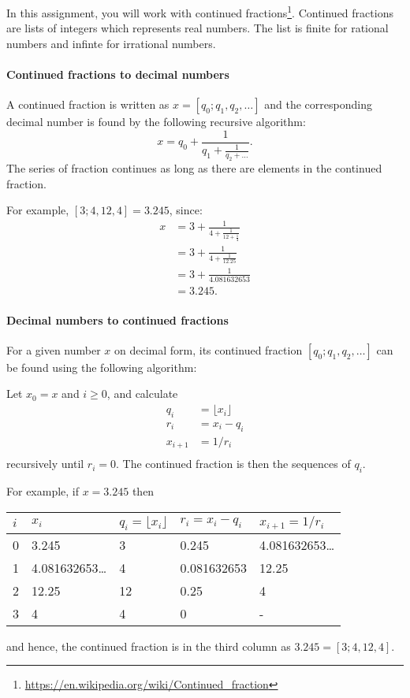In this assignment, you will work with continued
fractions\footnote{\url{https://en.wikipedia.org/wiki/Continued_fraction}}. Continued
fractions are lists of integers which represents real numbers. The
list is finite for rational numbers and infinte for irrational numbers. 

\paragraph{Continued fractions to decimal numbers}
A continued fraction is written as $x = [q_0; q_1, q_2, \ldots]$
and the corresponding decimal number is found by the following
recursive algorithm:
\begin{equation}
  x = q_0 + \frac{1}{q_1 + \frac{1}{q_2 + \dots}}.
\end{equation}
The series of fraction continues as long as there are elements in the
continued fraction.

For example, $[3;4, 12, 4] = 3.245$, since:
\begin{align}
  x &= 3 + \frac{1}{4 + \frac{1}{12 + \frac{1}{4}}}
  \\&=  3 + \frac{1}{4 + \frac{1}{12.25}}
  \\&=  3 + \frac{1}{4.081632653}
  \\&=  3.245.
\end{align}

\paragraph{Decimal numbers to continued fractions}
For a given number $x$ on decimal form, its continued fraction
$[q_0; q_1, q_2, \ldots]$ can be found using the following algorithm:

Let $x_0 = x$ and $i \geq 0$, and calculate
\begin{align}
q_i &= \lfloor x_i \rfloor\\
r_i &= x_i - q_i\\
x_{i+1} &= 1/r_i\\
\end{align}
recursively until $r_i = 0$. The continued fraction is then the
sequences of $q_i$.

For example, if $x=3.245$ then
\begin{center}
  \begin{tabular}{|l|l|l|l|l|}
    \hline
    $i$ & $x_i$ & $q_i = \lfloor x_i \rfloor$ & $r_i = x_i - q_i$ & $x_{i+1}=1/r_i$\\
    \hline
    0 & 3.245 & 3 & 0.245 & 4.081632653\ldots\\
    1 & 4.081632653\ldots & 4 & 0.081632653 & 12.25\\
    2 & 12.25 & 12 & 0.25 & 4\\
    3 & 4 & 4 & 0 & -\\
    \hline
  \end{tabular}
\end{center}
and hence, the continued fraction is in the third column as $3.245 = [3; 4, 12, 4]$.

